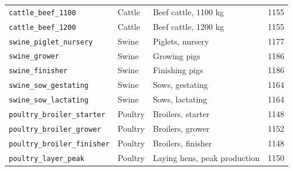 \documentclass[11pt]{article}
\begin{document}
\begin{longtable}{lllc}
\texttt{cattle\_beef\_1100} & Cattle & Beef cattle, 1100 kg & 1155 \\
\texttt{cattle\_beef\_1200} & Cattle & Beef cattle, 1200 kg & 1155 \\
\texttt{swine\_piglet\_nursery} & Swine & Piglets, nursery & 1177 \\
\texttt{swine\_grower} & Swine & Growing pigs & 1186 \\
\texttt{swine\_finisher} & Swine & Finishing pigs & 1186 \\
\texttt{swine\_sow\_gestating} & Swine & Sows, gestating & 1164 \\
\texttt{swine\_sow\_lactating} & Swine & Sows, lactating & 1164 \\
\texttt{poultry\_broiler\_starter} & Poultry & Broilers, starter & 1148 \\
\texttt{poultry\_broiler\_grower} & Poultry & Broilers, grower & 1152 \\
\texttt{poultry\_broiler\_finisher} & Poultry & Broilers, finisher & 1148 \\
\texttt{poultry\_layer\_peak} & Poultry & Laying hens, peak production & 1150 \\
\end{longtable}
\end{document}
